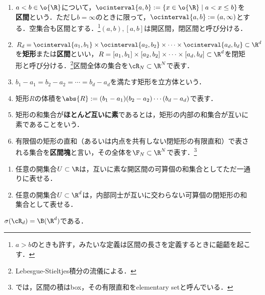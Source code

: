 \documentclass[uplatex, dvipdfmx]{jsreport}
\begin{document}
\begin{definition}\mbox{}
    \begin{enumerate}
        \item $a<b\in\o{\R}$について，$\ocinterval{a,b}:=\{x\in\o{\R}\mid a<x\le b\}$を\textbf{区間}という．ただし$b=\infty$のときに限って，$\ocinterval{a,b}:=(a,\infty)$とする．空集合も区間とする．\footnote{$a>b$のときも許す，みたいな定義は区間の長さを定義するときに齟齬を起こす．}$(a,b),[a,b]$は開区間，閉区間と呼び分ける．
        \item $R_d=\ocinterval{a_1,b_1}\times\ocinterval{a_2,b_2}\times\cdots\times\ocinterval{a_d,b_d}\subset\R^d$を\textbf{矩形}または\textbf{区間}といい，$R=[a_1,b_1]\times[a_2,b_2]\times\cdots\times[a_d,b_d]\subset\R^d$を閉矩形と呼び分ける．\footnote{Lebesgue-Stieltjes積分の流儀による．}区間全体の集合を$\cR_N\subset\R^N$で表す．
        \item $b_1-a_1=b_2-a_2=\cdots=b_d-a_d$を満たす矩形を立方体という．
        \item 矩形$R$の体積を$\abs{R}:=(b_1-a_1)(b_2-a_2)\cdots(b_d-a_d)$で表す．
        \item 矩形の和集合が\textbf{ほとんど互いに素}であるとは，矩形の内部の和集合が互いに素であることをいう．
        \item 有限個の矩形の直和（あるいは内点を共有しない閉矩形の有限直和）で表される集合を\textbf{区間塊}と言い，その全体を$\F_N\subset\R^N$で表す．\footnote{\cite{Tao11-MeasureTheory}では，区間の積はbox，その有限直和をelementary setと呼んでいる．}
    \end{enumerate}
\end{definition}

\begin{proposition}\mbox{}
    \begin{enumerate}
        \item 任意の開集合$U\subset\R$は，互いに素な開区間の可算個の和集合としてただ一通りに表せる．
        \item 任意の開集合$U\subset\R^d$は，内部同士が互いに交わらない可算個の閉矩形の和集合として表せる．
    \end{enumerate}
\end{proposition}

\begin{corollary}\label{cor-Borel-subsets-of-Euclidean-spaces}
    $\sigma(\cR_d)=\B(\R^d)$である．
\end{corollary}
\end{document}
